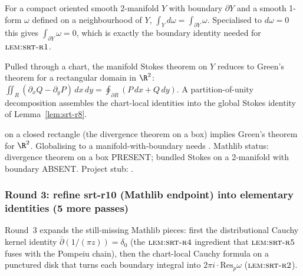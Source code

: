 \begin{lemma}
\label{lem:srt-r8}
For a compact oriented smooth 2-manifold $Y$ with boundary
$\partial Y$ and a smooth 1-form $\omega$ defined on a neighbourhood
of $Y$, $\int_{Y} d\omega = \int_{\partial Y} \omega$.  Specialised
to $d\omega = 0$ this gives $\int_{\partial Y} \omega = 0$, which is
exactly the boundary identity needed for $\textsc{lem:srt-r1}$.
\leanok
\end{lemma}

\begin{lemma}
\label{lem:srt-r9}
Pulled through a chart, the manifold Stokes theorem on $Y$ reduces
to Green's theorem for a rectangular domain in $\R^{2}$:
$\iint_{R} (\partial_{x} Q - \partial_{y} P)\,dx\,dy =
\oint_{\partial R} (P\,dx + Q\,dy)$.
A partition-of-unity decomposition assembles the chart-local
identities into the global Stokes identity of
Lemma~\ref{lem:srt-r8}.
\leanok
\end{lemma}

\begin{lemma}
\label{lem:srt-r10}
 on a closed
rectangle (the divergence theorem on a box) implies Green's theorem
for $\R^{2}$.  Globalising to a manifold-with-boundary needs
.
Mathlib status: divergence theorem on a box PRESENT; bundled Stokes
on a 2-manifold with boundary ABSENT.  Project stub:
.
\leanok
{}
\end{lemma}

\subsubsection*{Round 3: refine srt-r10 (Mathlib endpoint) into elementary identities (5 more passes)}

Round~3 expands the still-missing Mathlib pieces: first the
distributional Cauchy kernel identity
$\bar\partial(1/(\pi z)) = \delta_{0}$
(the $\textsc{lem:srt-r4}$ ingredient that $\textsc{lem:srt-r5}$
fuses with the Pompeiu chain), then the chart-local Cauchy formula
on a punctured disk that turns each boundary integral into
$2\pi i \cdot \mathrm{Res}_{p}\omega$ ($\textsc{lem:srt-r2}$).

